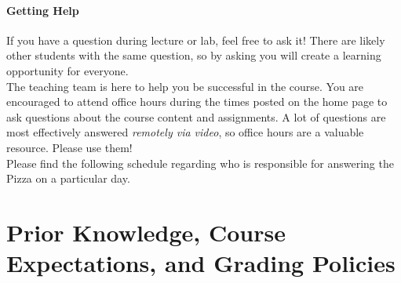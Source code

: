 \documentclass[11pt]{article}
\begin{document}
\paragraph{Getting Help}

If you have a question during lecture or lab, feel free to ask it! There are likely other students with the same question, so by asking you will create a learning opportunity for everyone. \\

The teaching team is here to help you be successful in the course. You are encouraged to attend office hours during the times posted on the home page to ask questions about the course content and assignments. A lot of questions are most effectively answered \emph{remotely via video}, so office hours are a valuable resource. Please use them! \\


Please find the following schedule regarding who is responsible for answering the Pizza on a particular day.

%


\section{Prior Knowledge, Course Expectations, and Grading Policies}
\end{document}
